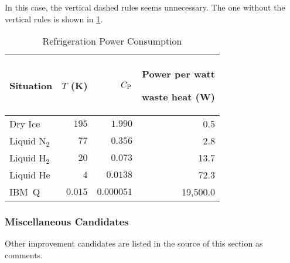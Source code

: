 In this case, the vertical dashed rules seems unnecessary.
The one without the vertical rules is shown in
\cref{tab:app:styleguide:Refrigeration Power Consumption (arydshln-2)}.

\begin{table}
\renewcommand*{\arraystretch}{1.2}\centering\small
\begin{tabular}{lrrr}\toprule
Situation
	& $T$ (K)
		& $C_\mathrm{P}$ & \parbox[b]{.75in}{\raggedleft Power per watt\par waste heat (W)} \\
\midrule
Dry Ice
	& $195$
		& $1.990$
			& 0.5 \\ \hdashline
Liquid N$_2$
	& $77$
		& $0.356$
			& 2.8 \\ \hdashline
Liquid H$_2$
	& $20$
		& $0.073$
			& 13.7 \\ \hdashline
Liquid He
	& $4$
		& $0.0138$
			& 72.3 \\ \hdashline
IBM~Q	& $0.015$
		& $0.000051$
			& 19,500.0 \\
\bottomrule
\end{tabular}
\caption{Refrigeration Power Consumption}
\label{tab:app:styleguide:Refrigeration Power Consumption (arydshln-2)}
\end{table}


\FloatBarrier

\subsubsection{Miscellaneous Candidates}
\label{sec:app:styleguide:Miscellaneous Candidates}

Other improvement candidates are listed in the source of this
section as comments.

%
%
